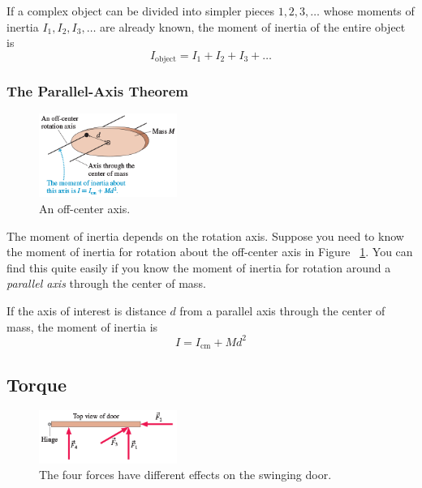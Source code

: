 If a complex object can be divided into simpler pieces
$
    1, 2, 3, \dots
$ whose moments of inertia
$
    I_1, I_2, I_3, \dots
$ are already known, the moment of inertia of the entire object is
\begin{equation}
    I_\mathrm{object} = I_1 + I_2 + I_3 + \dots
\end{equation}

\subsubsection{The Parallel-Axis Theorem}

\begin{figure}
    \centering
    \includegraphics[width=0.4\textwidth]{../figures/an-off-center-axis.png}
    \caption{An off-center axis.}%
    \label{fig:an-off-center-axis}
\end{figure}

The moment of inertia depends on the rotation axis.  Suppose you need to
know the moment of inertia for rotation about the off-center axis in
Figure~%
\ref{fig:an-off-center-axis}.  You can find this quite easily if you
know the moment of inertia for rotation around a \emph{parallel axis}
through the center of mass.

If the axis of interest is distance
$
    d
$ from a parallel axis through the center of mass, the moment of inertia
is
\begin{equation}
    I = I_\mathrm{cm} + Md^2
\end{equation}

\subsection{Torque}

\begin{figure}
    \centering
    \includegraphics[width=0.4\textwidth]{../figures/four-forces-on-door.png}
    \caption{The four forces have different effects on the swinging
    door.}%
    \label{fig:four-forces-on-door}
\end{figure}

